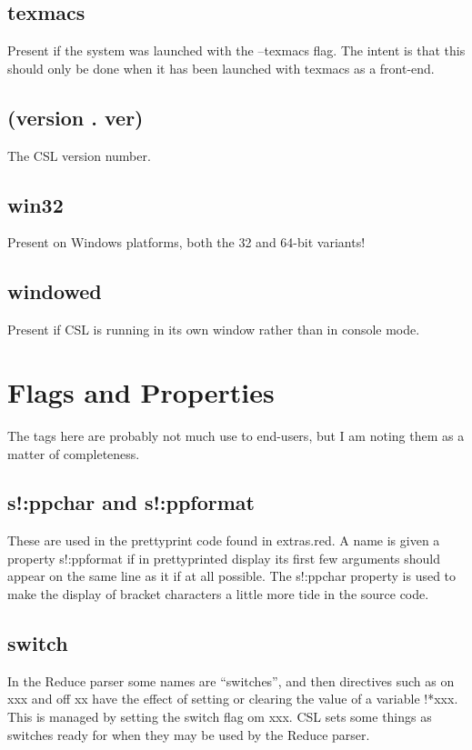 \documentclass[a4paper,11pt]{article}
\begin{document}
\subsection{\ttfamily texmacs}
Present if the system was launched with the {\ttfamily --texmacs} flag.
The intent is that this should only be done when it has been launched with
texmacs as a front-end.
\subsection{\ttfamily (version . ver)}
The CSL version number.
\subsection{\ttfamily win32}
Present on Windows platforms, both the 32 and 64-bit variants!
\subsection{\ttfamily windowed}
Present if CSL is running in its own window rather than in console mode.




\section{Flags and Properties}

The tags here are probably not much use to end-users, but I am noting them
as a matter of completeness.

\subsection{\ttfamily s!:ppchar and \ttfamily s!:ppformat}
These are used in the prettyprint code found in {\ttfamily extras.red}. A
name is given a property {\ttfamily s!:ppformat} if in prettyprinted display
its first few arguments should appear on the same line as it if at all
possible. The {\ttfamily s!:ppchar} property is used to make the display of
bracket characters a little more tide in the source code.
\subsection{\ttfamily switch}
In the Reduce parser some names are ``switches'', and then directives such
as {\ttfamily on xxx} and {\ttfamily off xx} have the effect of setting or
clearing the value of a variable {\ttfamily !*xxx}. This is managed by
setting the {\ttfamily switch} flag om {\ttfamily xxx}. CSL sets some
things as switches ready for when they may be used by the Reduce parser.
\end{document}
